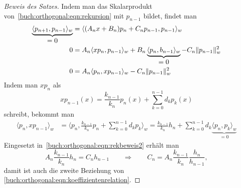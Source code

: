 \begin{proof}[Beweis des Satzes]
Indem man das Skalarprodukt von~\eqref{buch:orthogonal:eqn:rekursion}
mit $p_{n-1}$ bildet, findet man
\begin{align}
\underbrace{\langle
p_{n+1},p_{n-1}
\rangle_w}_{\displaystyle=0}
&=
\langle (A_nx+B_n)p_n+C_np_{n-1},p_{n-1} \rangle_w
\notag
\\
0
&=
A_n\langle xp_n,p_{n-1} \rangle_w
+B_n\underbrace{\langle p_n,b_{n-1}\rangle_w}_{\displaystyle=0}
-C_n\|p_{n-1}\|_w^2
\notag
\\
0
&=
A_n\langle p_n,xp_{n-1} \rangle_w
-C_n\|p_{n-1}\|_w^2
\label{buch:orthogonal:eqn:rekbeweis2}
\end{align}
Indem man $xp_n$ als
\[
xp_{n-1}(x)
=
\frac{k_{n-1}}{k_n} p_n(x)
+
\sum_{k=0}^{n-1} d_kp_k(x)
\]
schreibt, bekommt man
\begin{align*}
\langle
p_n,
xp_{n-1}
\rangle_w
&=
\biggl\langle
p_n,
\frac{k_{n-1}}{k_n} p_n
+
\sum_{k=0}^{n-1} d_kp_k
\biggr\rangle_w
=
\frac{k_{n-1}}{k_n}h_n
+
\sum_{k=0}^{n-1} d_k\underbrace{\langle p_n,p_k\rangle_w}_{\displaystyle=0}
\end{align*}
Eingesetzt in~\eqref{buch:orthogonal:eqn:rekbeweis2} erhält man
\[
A_n\frac{k_{n-1}}{k_n}h_n = C_n h_{n-1}
\qquad\Rightarrow\qquad
C_n
=
A_n\frac{k_{n-1}}{k_n}\frac{h_n}{h_{n-1}},
\]
damit ist auch die zweite Beziehung von
\eqref{buch:orthogonal:eqn:koeffizientenrelation}.
\end{proof}

